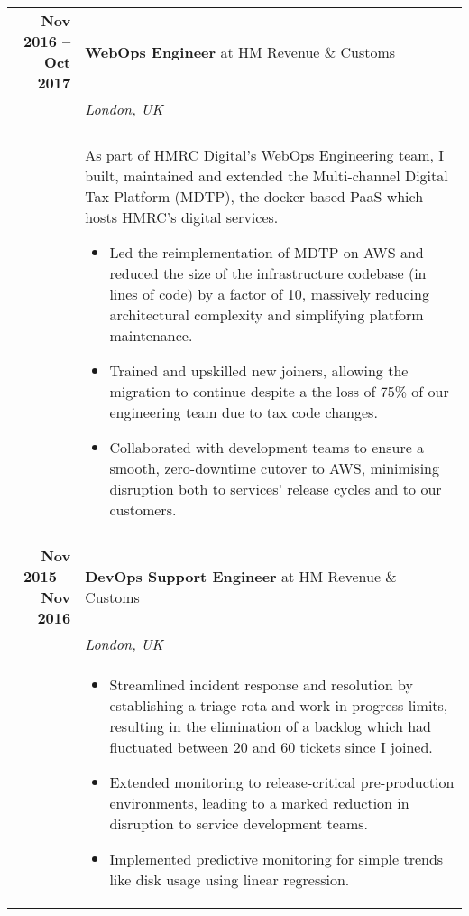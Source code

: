 \documentclass[a4paper,10pt]{article} %
\begin{document}
\begin{tabularx}{\textwidth}{r|X}
\textbf{Nov 2016 -- Oct 2017}        & \textbf{WebOps Engineer} at HM Revenue \& Customs \\
                                    & \emph{London, UK} \\
                                    & \\
                                    & \footnotesize
    {As part of HMRC Digital's WebOps Engineering team, I built, maintained and
        extended the Multi-channel Digital Tax Platform (MDTP), the
        docker-based PaaS which hosts HMRC's digital services.
    \begin{itemize}
    \item Led the reimplementation of MDTP on AWS and reduced the size of the
        infrastructure codebase (in lines of code) by a factor of 10, massively
        reducing architectural complexity and simplifying platform maintenance.
    \item Trained and upskilled new joiners, allowing the migration to continue
        despite a the loss of 75\% of our engineering team due to tax code
        changes.
    \item Collaborated with development teams to ensure a smooth, zero-downtime
        cutover to AWS, minimising disruption both to services' release cycles
        and to our customers.
    \end{itemize}}\\

\multicolumn{2}{r}{} \\ %

\textbf{Nov 2015 -- Nov 2016}       & \textbf{DevOps Support Engineer} at HM Revenue \& Customs \\
                                    & \emph{London, UK} \\
                                    & \footnotesize
    {\begin{itemize}[after=\vspace{-2\baselineskip}]
    \item Streamlined incident response and resolution by establishing a triage
    rota and work-in-progress limits, resulting in the elimination of a backlog
    which had fluctuated between 20 and 60 tickets since I joined.
    \item Extended monitoring to release-critical pre-production environments,
        leading to a marked reduction in disruption to service development
        teams.
    \item Implemented predictive monitoring for simple trends like disk usage
    using linear regression.
    \end{itemize}}\\

\end{tabularx}
\end{document}

